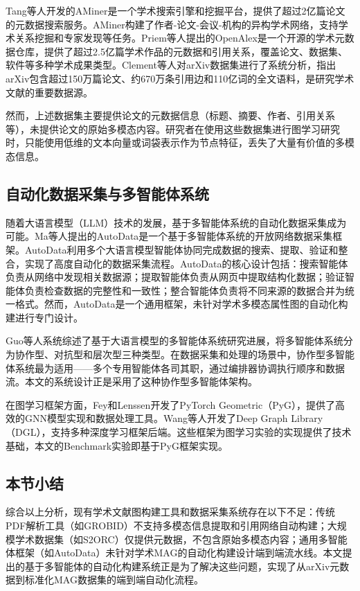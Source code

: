 Tang等人\cite{tang2008arnetminer}开发的AMiner是一个学术搜索引擎和挖掘平台，提供了超过2亿篇论文的元数据搜索服务。AMiner构建了作者-论文-会议-机构的异构学术网络，支持学术关系挖掘和专家发现等任务。Priem等人\cite{priem2022openalex}提出的OpenAlex是一个开源的学术元数据仓库，提供了超过2.5亿篇学术作品的元数据和引用关系，覆盖论文、数据集、软件等多种学术成果类型。Clement等人\cite{clement2019arxiv}对arXiv数据集进行了系统分析，指出arXiv包含超过150万篇论文、约670万条引用边和110亿词的全文语料，是研究学术文献的重要数据源。

然而，上述数据集主要提供论文的元数据信息（标题、摘要、作者、引用关系等），未提供论文的原始多模态内容。研究者在使用这些数据集进行图学习研究时，只能使用低维的文本向量或词袋表示作为节点特征，丢失了大量有价值的多模态信息。

\subsection{自动化数据采集与多智能体系统}

随着大语言模型（LLM）技术的发展，基于多智能体系统的自动化数据采集成为可能。Ma等人\cite{ma2025autodata}提出的AutoData是一个基于多智能体系统的开放网络数据采集框架。AutoData利用多个大语言模型智能体协同完成数据的搜索、提取、验证和整合，实现了高度自动化的数据采集流程。AutoData的核心设计包括：搜索智能体负责从网络中发现相关数据源；提取智能体负责从网页中提取结构化数据；验证智能体负责检查数据的完整性和一致性；整合智能体负责将不同来源的数据合并为统一格式。然而，AutoData是一个通用框架，未针对学术多模态属性图的自动化构建进行专门设计。

Guo等人\cite{guo2024llm_agent_survey}系统综述了基于大语言模型的多智能体系统研究进展，将多智能体系统分为协作型、对抗型和层次型三种类型。在数据采集和处理的场景中，协作型多智能体系统最为适用——多个专用智能体各司其职，通过编排器协调执行顺序和数据流。本文的系统设计正是采用了这种协作型多智能体架构。

在图学习框架方面，Fey和Lenssen\cite{fey2019pyg}开发了PyTorch Geometric（PyG），提供了高效的GNN模型实现和数据处理工具。Wang等人\cite{wang2019dgl}开发了Deep Graph Library（DGL），支持多种深度学习框架后端。这些框架为图学习实验的实现提供了技术基础，本文的Benchmark实验即基于PyG框架实现。

\subsection{本节小结}

综合以上分析，现有学术文献图构建工具和数据采集系统存在以下不足：传统PDF解析工具（如GROBID）不支持多模态信息提取和引用网络自动构建；大规模学术数据集（如S2ORC）仅提供元数据，不包含原始多模态内容；通用多智能体框架（如AutoData）未针对学术MAG的自动化构建设计端到端流水线。本文提出的基于多智能体的自动化构建系统正是为了解决这些问题，实现了从arXiv元数据到标准化MAG数据集的端到端自动化流程。

